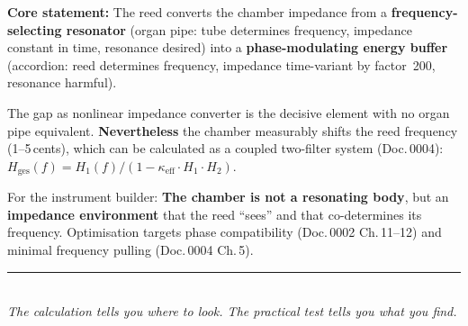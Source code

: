 \documentclass[11pt,a4paper]{article}
\begin{document}
\begin{keybox}
\textbf{Core statement:} The reed converts the chamber impedance from a \textbf{frequency-selecting resonator} (organ pipe: tube determines frequency, impedance constant in time, resonance desired) into a \textbf{phase-modulating energy buffer} (accordion: reed determines frequency, impedance time-variant by factor~200, resonance harmful).

The gap as nonlinear impedance converter is the decisive element with no organ pipe equivalent. \textbf{Nevertheless} the chamber measurably shifts the reed frequency (1--5\,cents), which can be calculated as a coupled two-filter system (Doc.\,0004): $H_\text{ges}(f) = H_1(f) / (1 - \kappa_\text{eff} \cdot H_1 \cdot H_2)$.

For the instrument builder: \textbf{The chamber is not a resonating body}, but an \textbf{impedance environment} that the reed ``sees'' and that co-determines its frequency. Optimisation targets phase compatibility (Doc.\,0002 Ch.\,11--12) and minimal frequency pulling (Doc.\,0004 Ch.\,5).
\end{keybox}

\vspace{3mm}
\begin{center}
\textcolor{accentred}{\rule{0.6\textwidth}{1pt}}\\[4pt]
{\small\itshape The calculation tells you where to look. The practical test tells you what you find.}
\end{center}
\end{document}
